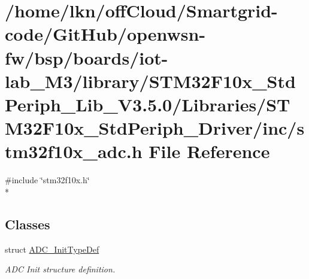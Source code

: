 \hypertarget{iot-lab___m3_2library_2_s_t_m32_f10x___std_periph___lib___v3_85_80_2_libraries_2_s_t_m32_f10x___5faea8605bfc9c59c81bcd374ecee680}{}\section{/home/lkn/off\+Cloud/\+Smartgrid-\/code/\+Git\+Hub/openwsn-\/fw/bsp/boards/iot-\/lab\+\_\+\+M3/library/\+S\+T\+M32\+F10x\+\_\+\+Std\+Periph\+\_\+\+Lib\+\_\+\+V3.5.0/\+Libraries/\+S\+T\+M32\+F10x\+\_\+\+Std\+Periph\+\_\+\+Driver/inc/stm32f10x\+\_\+adc.h File Reference}
\label{iot-lab___m3_2library_2_s_t_m32_f10x___std_periph___lib___v3_85_80_2_libraries_2_s_t_m32_f10x___5faea8605bfc9c59c81bcd374ecee680}
{\ttfamily \#include \char`\"{}stm32f10x.\+h\char`\"{}}\\*
\subsection*{Classes}
\begin{DoxyCompactItemize}
\item 
struct \hyperlink{struct_a_d_c___init_type_def}{A\+D\+C\+\_\+\+Init\+Type\+Def}
\begin{DoxyCompactList}\small\item\em A\+DC Init structure definition. \end{DoxyCompactList}\end{DoxyCompactItemize}
